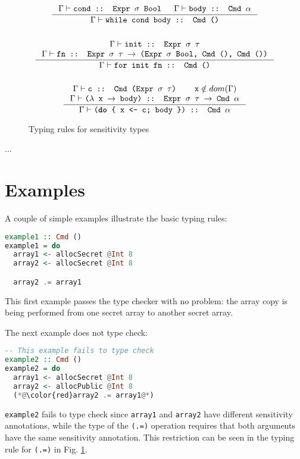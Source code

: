 \documentclass[10pt, conference]{IEEEtran}
\newcommand{\ttt}{\texttt}
\newcommand{\rarr}{\rightarrow}
\begin{document}
\begin{figure}[h]
{\begin{minipage}{\linewidth}
\begin{gather*}
  \\
  \inference{%
    \Gamma \vdash \ttt{cond :: Expr $\sigma$ Bool}
    & \Gamma \vdash \ttt{body :: Cmd $\alpha$}}
    {\Gamma \vdash \ttt{while cond body :: Cmd ()}}\\
  \\
  \inference{%
    \Gamma \vdash \ttt{init :: Expr $\sigma$ $\tau$}\\
    \Gamma \vdash \ttt{fn :: Expr $\sigma$ $\tau$ $\rarr$ (Expr $\sigma$ Bool, Cmd (), Cmd ())}
    }{\Gamma \vdash \ttt{for init fn :: Cmd ()}}\\
  \\
  \inference{%
    \Gamma \vdash \ttt{c :: Cmd (Expr $\sigma$ $\tau$)}
    & \ttt{x} \notin dom(\Gamma)
    \\ \Gamma \vdash \ttt{($\lambda$ x $\rarr$ body) :: Expr $\sigma$ $\tau$ $\rarr$ Cmd $\alpha$}
  }{%
    \Gamma \vdash \ttt{(\textbf{do} \{ x <- c; body \}) :: Cmd $\alpha$}
  }
\end{gather*}
\end{minipage}}
  \caption{Typing rules for sensitivity types}
\label{fig:SensTypes}
\end{figure}

...

\section{Examples}

A couple of simple examples illustrate the basic typing rules:

\begin{lstlisting}[language=haskell]
example1 :: Cmd ()
example1 = do
  array1 <- allocSecret @Int 8
  array2 <- allocSecret @Int 8

  array2 .= array1
\end{lstlisting}

\noindent This first example passes the type checker with no problem: the array copy
is being performed from one secret array to another secret array.

The next example does not type check:

\begin{lstlisting}[language=haskell]
  -- This example fails to type check
example2 :: Cmd ()
example2 = do
  array1 <- allocSecret @Int 8
  array2 <- allocPublic @Int 8
  (*@\color{red}array2 .= array1@*)
\end{lstlisting}

\noindent \ttt{example2} fails to type check since \ttt{array1} and \ttt{array2} have
different sensitivity annotations, while the type of the \ttt{(.=)} operation
requires that both arguments have the same sensitivity annotation. This restriction can
be seen in the typing rule for \ttt{(.=)} in Fig. \ref{fig:SensTypes}.
\end{document}
